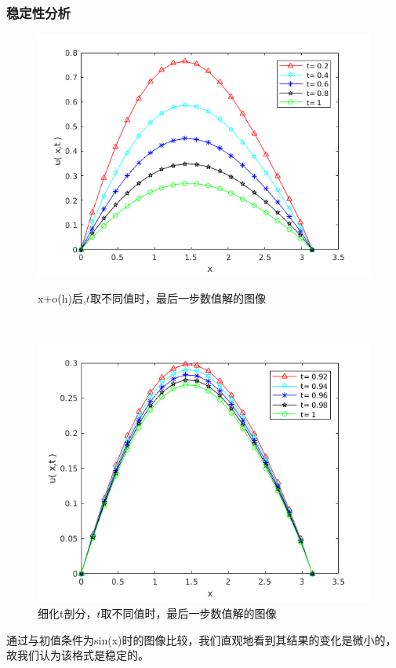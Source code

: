 \documentclass[notheorems,serif]{beamer}
\begin{document}
\begin{frame}
\frametitle{稳定性分析}
\begin{figure}[h]
	\begin{minipage}[t]{0.4\linewidth}%
		\centering     %
		\includegraphics[width=1.2\textwidth]{t1+o.png}
		\caption{x+o(h)后,$t$取不同值时，最后一步数值解的图像}%
		\label{fig:liuchengtu1}%
	\end{minipage} 
	\hfill
	\begin{minipage}[t]{0.4\linewidth}
		\centering
		\includegraphics[width=1.2\textwidth]{t2+o.png}
		\caption{细化t剖分，$t$取不同值时，最后一步数值解的图像}%
		\label{fig:liuchengtu2}
	\end{minipage}
\end{figure}

通过与初值条件为sin(x)时的图像比较，我们直观地看到其结果的变化是微小的，故我们认为该格式是稳定的。
\end{frame}
\end{document}
